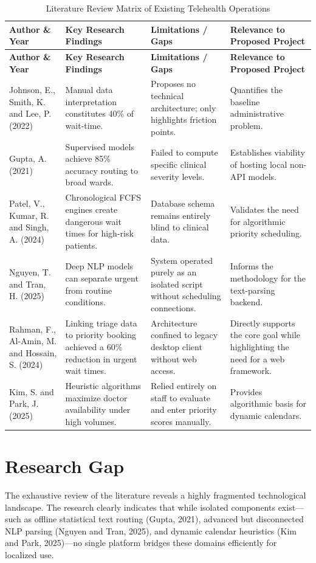 \documentclass[12pt,a4paper]{report}
\begin{document}
\begin{longtable}{|p{3.5cm}|p{3.5cm}|p{3.5cm}|p{4cm}|}
\caption{Literature Review Matrix of Existing Telehealth Operations} \\
\hline
\textbf{Author \& Year} & \textbf{Key Research Findings} & \textbf{Limitations / Gaps} & \textbf{Relevance to Proposed Project} \\ \hline
\endfirsthead
\hline
\textbf{Author \& Year} & \textbf{Key Research Findings} & \textbf{Limitations / Gaps} & \textbf{Relevance to Proposed Project} \\ \hline
\endhead
Johnson, E., Smith, K. and Lee, P. (2022) & Manual data interpretation constitutes 40\% of wait-time. & Proposes no technical architecture; only highlights friction points. & Quantifies the baseline administrative problem. \\ \hline
Gupta, A. (2021) & Supervised models achieve 85\% accuracy routing to broad wards. & Failed to compute specific clinical severity levels. & Establishes viability of hosting local non-API models. \\ \hline
Patel, V., Kumar, R. and Singh, A. (2024) & Chronological FCFS engines create dangerous wait times for high-risk patients. & Database schema remains entirely blind to clinical data. & Validates the need for algorithmic priority scheduling. \\ \hline
Nguyen, T. and Tran, H. (2025) & Deep NLP models can separate urgent from routine conditions. & System operated purely as an isolated script without scheduling connections. & Informs the methodology for the text-parsing backend. \\ \hline
Rahman, F., Al-Amin, M. and Hossain, S. (2024) & Linking triage data to priority booking achieved a 60\% reduction in urgent wait times. & Architecture confined to legacy desktop client without web access. & Directly supports the core goal while highlighting the need for a web framework. \\ \hline
Kim, S. and Park, J. (2025) & Heuristic algorithms maximize doctor availability under high volumes. & Relied entirely on staff to evaluate and enter priority scores manually. & Provides algorithmic basis for dynamic calendars. \\ \hline
\end{longtable}

\section{Research Gap}
The exhaustive review of the literature reveals a highly fragmented technological landscape. The research clearly indicates that while isolated components exist—such as offline statistical text routing (Gupta, 2021), advanced but disconnected NLP parsing (Nguyen and Tran, 2025), and dynamic calendar heuristics (Kim and Park, 2025)—no single platform bridges these domains efficiently for localized use.
\end{document}
